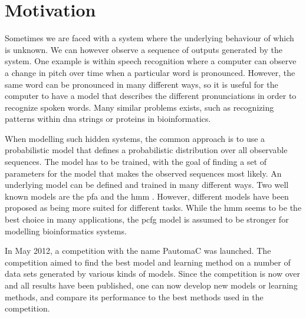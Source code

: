 \section{Motivation}
Sometimes we are faced with a system where the underlying behaviour of which is unknown. We can however observe a sequence of outputs generated by the system. One example is within speech recognition \cite{Rabiner89hmm} where a computer can observe a change in pitch over time when a particular word is pronounced. However, the same word can be pronounced in many different ways, so it is useful for the computer to have a model that describes the different pronunciations in order to recognize spoken words. Many similar problems exists, such as recognizing patterns within \gls{dna} strings or proteins in bioinformatics\cite{Sakakibara2005}.

When modelling such hidden systems, the common approach is to use a probabilistic model that defines a probabilistic distribution over all observable sequences. The model has to be trained, with the goal of finding a set of parameters for the model that makes the observed sequences most likely. An underlying model can be defined and trained in many different ways. Two well known models are the \gls{pfa} \cite{pazintroduction} and the \gls{hmm} \cite{Rabiner89hmm}. However, different models have been proposed as being more suited for different tasks. While the \gls{hmm} seems to be the best choice in many applications, the \gls{pcfg} model is assumed to be stronger for modelling bioinformatics systems\cite{Sakakibara2005}.

In May 2012, a competition with the name PautomaC was launched. The competition aimed to find the best model and learning method on a number of data sets generated by various kinds of models. Since the competition is now over and all results have been published, one can now develop new models or learning methods, and compare its performance to the best methods used in the competition.